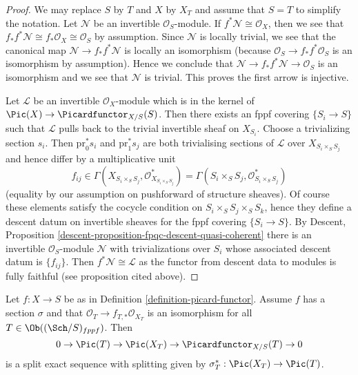 \begin{proof}
We may replace $S$ by $T$ and $X$ by $X_T$ and assume that $S = T$
to simplify the notation. Let $\mathcal{N}$ be an invertible
$\mathcal{O}_S$-module. If $f^*\mathcal{N} \cong \mathcal{O}_X$, then
we see that $f_*f^*\mathcal{N} \cong f_*\mathcal{O}_X \cong \mathcal{O}_S$
by assumption. Since $\mathcal{N}$ is locally trivial, we see that
the canonical map $\mathcal{N} \to f_*f^*\mathcal{N}$ is locally
an isomorphism (because $\mathcal{O}_S \to f_*f^*\mathcal{O}_S$
is an isomorphism by assumption). Hence we conclude that
$\mathcal{N} \to f_*f^*\mathcal{N} \to \mathcal{O}_S$ is an isomorphism
and we see that $\mathcal{N}$ is trivial. This proves the first arrow
is injective.

\medskip\noindent
Let $\mathcal{L}$ be an invertible $\mathcal{O}_X$-module which is in
the kernel of $\Pic(X) \to \Picardfunctor_{X/S}(S)$. Then there exists
an fppf covering $\{S_i \to S\}$ such that $\mathcal{L}$ pulls back
to the trivial invertible sheaf on $X_{S_i}$. Choose a trivializing
section $s_i$. Then $\text{pr}_0^*s_i$ and $\text{pr}_1^*s_j$ are both
trivialising sections of $\mathcal{L}$ over $X_{S_i \times_S S_j}$
and hence differ by a multiplicative unit
$$
f_{ij} \in
\Gamma(X_{S_i \times_S S_j}, \mathcal{O}_{X_{S_i \times_S S_j}}^*) =
\Gamma(S_i \times_S S_j, \mathcal{O}_{S_i \times_S S_j}^*)
$$
(equality by our assumption on pushforward of structure sheaves).
Of course these elements satisfy the cocycle condition on
$S_i \times_S S_j \times_S S_k$, hence they define a descent datum
on invertible sheaves for the fppf covering $\{S_i \to S\}$.
By Descent, Proposition \ref{descent-proposition-fpqc-descent-quasi-coherent}
there is an invertible $\mathcal{O}_S$-module $\mathcal{N}$
with trivializations over $S_i$ whose associated descent datum is
$\{f_{ij}\}$. Then $f^*\mathcal{N} \cong \mathcal{L}$ as the
functor from descent data to modules is fully faithful (see proposition
cited above).
\end{proof}

\begin{lemma}
\label{lemma-flat-geometrically-connected-fibres-with-section}
Let $f : X \to S$ be as in Definition \ref{definition-picard-functor}.
Assume $f$ has a section $\sigma$ and that
$\mathcal{O}_T \to f_{T, *}\mathcal{O}_{X_T}$ is an isomorphism
for all $T \in \Ob((\Sch/S)_{fppf})$. Then
$$
0 \to \Pic(T) \to \Pic(X_T) \to \Picardfunctor_{X/S}(T) \to 0
$$
is a split exact sequence with splitting given by
$\sigma_T^* : \Pic(X_T) \to \Pic(T)$.
\end{lemma}

